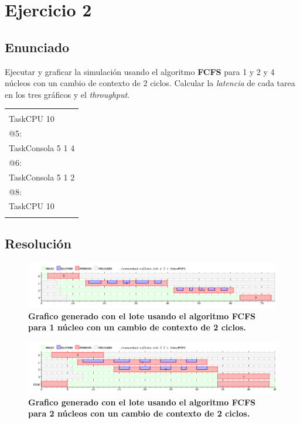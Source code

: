 \section{Ejercicio 2}

\subsection{Enunciado}

Ejecutar y graficar la simulación usando el algoritmo \textbf{FCFS} para 1 y 2 y 4 núcleos con un cambio de contexto de 2 ciclos. Calcular la \textit{latencia} de cada tarea en los tres gráficos y el \textit{throughput}.

\begin{center}
	\begin{tabular}{|l|}
		\hline
							\\
		TaskCPU 10			\\
		@5:					\\
		TaskConsola 5 1 4	\\
		@6:					\\
		TaskConsola 5 1 2	\\
		@8:					\\
		TaskCPU 10			\\
							\\
		\hline
	\end{tabular}
\end{center}


\subsection{Resolución}

\begin{figure}[!h]
	\begin{center}
		\includegraphics[width=500px]{imagenes/ej2_1.png}
		\caption{\small{\textbf{Grafico generado con el lote usando el algoritmo FCFS para 1 núcleo con un cambio de contexto de 2 ciclos.}}}
		\label{fig:grafico_ej2_1}
	\end{center}
\end{figure}

\begin{figure}[!h]
	\begin{center}
		\includegraphics[width=500px]{imagenes/ej2_2.png}
		\caption{\small{\textbf{Grafico generado con el lote usando el algoritmo FCFS para 2 núcleos con un cambio de contexto de 2 ciclos.}}}
		\label{fig:grafico_ej2_2}
	\end{center}
\end{figure}

